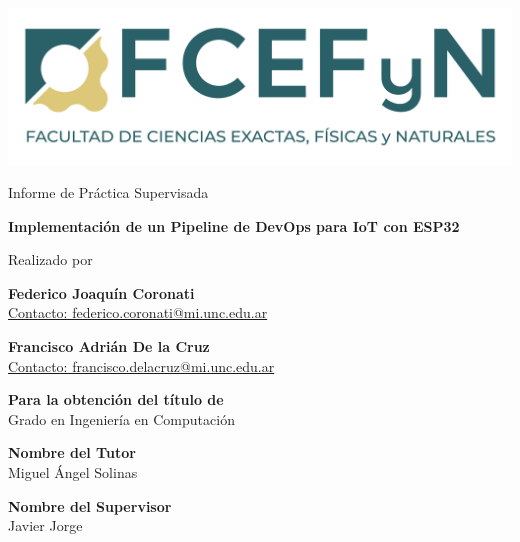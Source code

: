 \begin{center}

    \vspace*{1cm}
    
    \includegraphics[width=\textwidth]{fig/FCEFyN-Duotono_tagline.png}
    
    \vspace*{2cm}
    \begin{large}
    Informe de Práctica Supervisada
    \end{large}
    
    \vspace*{0.1in}
    \textbf{\huge Implementación de un Pipeline de DevOps para IoT con ESP32} %
    
    \vspace*{.2in}
    
    {\large Realizado por}\\
    \vspace*{.2in}
    
    \textbf{\Large Federico Joaquín Coronati}\\ %
    \href{mailto:federico.coronati@mi.unc.edu.ar}{Contacto: federico.coronati@mi.unc.edu.ar}
    
    \textbf{\Large Francisco Adrián De la Cruz}\\ %
    \href{mailto:francisco.delacruz@mi.unc.edu.ar}{Contacto: francisco.delacruz@mi.unc.edu.ar}
    
    \vspace*{3cm}
    
    \textbf{Para la obtención del título de}\\
    {\large Grado en Ingeniería en Computación} %
    
    \vspace*{0.2in}
    
    \textbf{Nombre del Tutor}\\
    {\large Miguel Ángel Solinas}\\ %
    
    \vspace*{0.2in}
    
    \textbf{Nombre del Supervisor}\\
    {\large Javier Jorge}
    

\end{center}


\thispagestyle{empty} %
\clearpage\setcounter{page}{1} %
